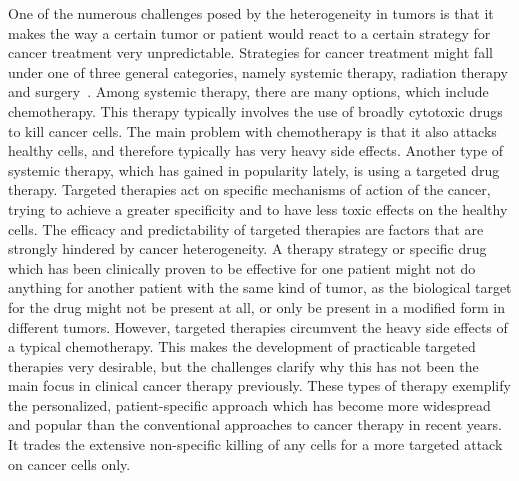 One of the numerous challenges posed by the heterogeneity in tumors is that it makes the way a certain tumor or patient would react to a certain strategy for cancer treatment very unpredictable.
Strategies for cancer treatment might fall under one of three general categories, namely systemic therapy, radiation therapy and surgery~\cite{cancer_surgery}.
Among systemic therapy, there are many options, which include chemotherapy.
This therapy typically involves the use of broadly cytotoxic drugs to kill cancer cells.
The main problem with chemotherapy is that it also attacks healthy cells, and therefore typically has very heavy side effects.
Another type of systemic therapy, which has gained in popularity lately, is using a targeted drug therapy.
Targeted therapies act on specific mechanisms of action of the cancer, trying to achieve a greater specificity and to have less toxic effects on the healthy cells.
The efficacy and predictability of targeted therapies are factors that are strongly hindered by cancer heterogeneity.
A therapy strategy or specific drug which has been clinically proven to be effective for one patient might not do anything for another patient with the same kind of tumor, as the biological target for the drug might not be present at all, or only be present in a modified form in different tumors.
However, targeted therapies circumvent the heavy side effects of a typical chemotherapy.
This makes the development of practicable targeted therapies very desirable, but the challenges clarify why this has not been the main focus in clinical cancer therapy previously.
These types of therapy exemplify the personalized, patient-specific approach which has become more widespread and popular than the conventional approaches to cancer therapy in recent years. It trades the extensive non-specific killing of any cells for a more targeted attack on cancer cells only.


